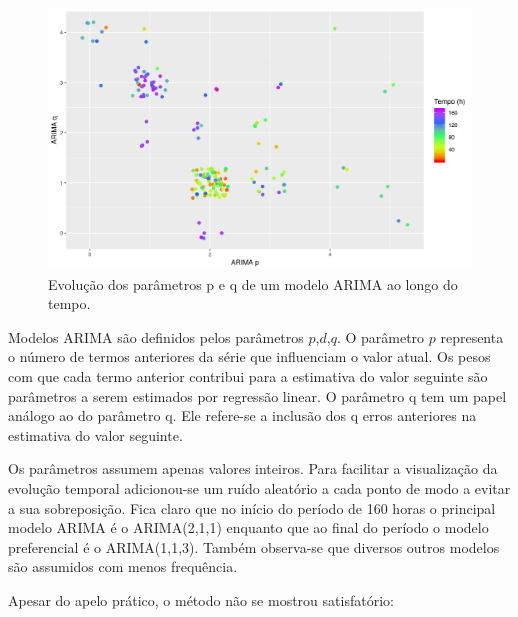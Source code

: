 \documentclass[
	12pt,				%
	openright,			%
	oneside,			%
	a4paper,			%
	english,			%
	french,				%
	spanish,			%
	brazil				%
	]{abntex2}
\begin{document}
\begin{figure}[h]
    \centering
	\includegraphics[width=\textwidth]{var_arima}
	\caption{Evolução dos parâmetros p e q de um modelo ARIMA ao longo do tempo.}
\end{figure}
\FloatBarrier

Modelos ARIMA são definidos pelos parâmetros $p$,$d$,$q$. O parâmetro $p$ representa o número de termos anteriores da série que influenciam o valor atual. Os pesos com que cada termo anterior contribui para a estimativa do valor seguinte são parâmetros a serem estimados por regressão linear.
O parâmetro q tem um papel análogo ao do parâmetro q. Ele refere-se a inclusão dos q erros anteriores na estimativa do valor seguinte.

Os parâmetros assumem apenas valores inteiros. Para facilitar a visualização da evolução temporal adicionou-se um ruído aleatório a cada ponto de modo a evitar a sua sobreposição. Fica claro que no início do período de 160 horas o principal modelo ARIMA é o ARIMA(2,1,1) enquanto que ao final do período o modelo preferencial é o ARIMA(1,1,3). Também observa-se que diversos outros modelos são assumidos com menos frequência.

Apesar do apelo prático, o método não se mostrou satisfatório:

\end{document}
